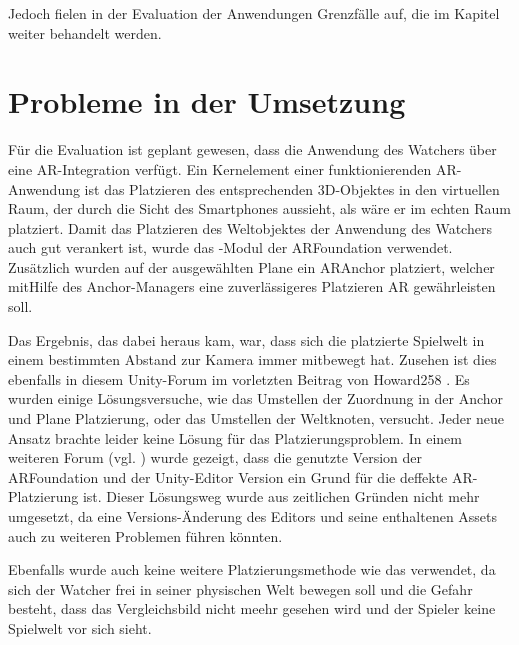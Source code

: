 Jedoch fielen in der Evaluation der Anwendungen Grenzfälle auf, die im Kapitel  weiter behandelt werden.














\section{Probleme in der Umsetzung}
Für die Evaluation ist geplant gewesen, dass die Anwendung des Watchers über eine \ac{AR}-Integration verfügt. Ein Kernelement einer funktionierenden \ac{AR}-Anwendung ist das Platzieren des entsprechenden \ac{3D}-Objektes in den virtuellen Raum, der durch die Sicht des Smartphones aussieht, als wäre er im echten Raum platziert. Damit das Platzieren des Weltobjektes der Anwendung des Watchers auch gut verankert ist, wurde das -Modul der \ac{AR}Foundation verwendet. Zusätzlich wurden auf der ausgewählten Plane ein \ac{AR}Anchor platziert, welcher mitHilfe des Anchor-Managers eine zuverlässigeres Platzieren \ac{AR} gewährleisten soll.

Das Ergebnis, das dabei heraus kam, war, dass sich die platzierte Spielwelt in einem bestimmten Abstand zur Kamera immer mitbewegt hat. Zusehen ist dies ebenfalls in diesem Unity-Forum im vorletzten Beitrag von Howard258 \cite{noauthor_unity_2025}. Es wurden einige Lösungsversuche, wie das Umstellen der Zuordnung in der Anchor und Plane Platzierung, oder das Umstellen der Weltknoten, versucht. Jeder neue Ansatz brachte leider keine Lösung für das Platzierungsproblem. In einem weiteren Forum (vgl. \cite{noauthor_ar_2023}) wurde gezeigt, dass die genutzte Version der \ac{AR}Foundation und der Unity-Editor Version ein Grund für die deffekte \ac{AR}-Platzierung ist. Dieser Lösungsweg wurde aus zeitlichen Gründen nicht mehr umgesetzt, da eine Versions-Änderung des Editors und seine enthaltenen Assets auch zu weiteren Problemen führen könnten. 

Ebenfalls wurde auch keine weitere Platzierungsmethode wie das  verwendet, da sich der Watcher frei in seiner physischen Welt bewegen soll und die Gefahr besteht, dass das Vergleichsbild nicht meehr gesehen wird und der Spieler keine Spielwelt vor sich sieht.

